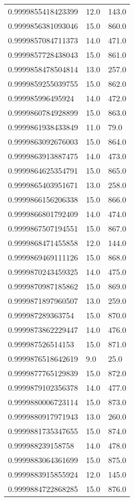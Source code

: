 \begin{center}
\begin{supertabular}[H]{p{0.30\textwidth}p{0.05\textwidth}p{0.05\textwidth}}
0.9999855418423399 & 12.0 & 143.0 \\ 
0.9999856381093046 & 15.0 & 860.0 \\ 
0.9999857084711373 & 14.0 & 471.0 \\ 
0.9999857728438043 & 15.0 & 861.0 \\ 
0.9999858478504814 & 13.0 & 257.0 \\ 
0.9999859255039755 & 15.0 & 862.0 \\ 
0.999985996495924 & 14.0 & 472.0 \\ 
0.9999860784928899 & 15.0 & 863.0 \\ 
0.9999861938433849 & 11.0 & 79.0 \\ 
0.9999863092676003 & 15.0 & 864.0 \\ 
0.9999863913887475 & 14.0 & 473.0 \\ 
0.9999864625354791 & 15.0 & 865.0 \\ 
0.9999865403951671 & 13.0 & 258.0 \\ 
0.9999866156206338 & 15.0 & 866.0 \\ 
0.9999866801792409 & 14.0 & 474.0 \\ 
0.9999867507194551 & 15.0 & 867.0 \\ 
0.9999868471455858 & 12.0 & 144.0 \\ 
0.9999869469111126 & 15.0 & 868.0 \\ 
0.9999870243459325 & 14.0 & 475.0 \\ 
0.9999870987185862 & 15.0 & 869.0 \\ 
0.9999871897960507 & 13.0 & 259.0 \\ 
0.999987289363754 & 15.0 & 870.0 \\ 
0.9999873862229447 & 14.0 & 476.0 \\ 
0.999987526514153 & 15.0 & 871.0 \\ 
0.9999876518642619 & 9.0 & 25.0 \\ 
0.9999877765129839 & 15.0 & 872.0 \\ 
0.9999879102356378 & 14.0 & 477.0 \\ 
0.9999880006723114 & 15.0 & 873.0 \\ 
0.9999880917971943 & 13.0 & 260.0 \\ 
0.9999881735347655 & 15.0 & 874.0 \\ 
0.999988239158758 & 14.0 & 478.0 \\ 
0.9999883064361699 & 15.0 & 875.0 \\ 
0.9999883915855924 & 12.0 & 145.0 \\ 
0.9999884722868285 & 15.0 & 876.0 \\ 

\end{supertabular}
\end{center}
